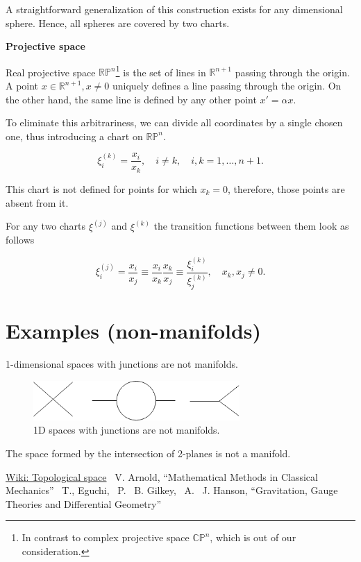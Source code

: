\documentclass[a4paper,10pt]{article}
\begin{document}
A straightforward generalization of this construction exists for any dimensional sphere. Hence, all spheres are covered by two charts.
\newline

{\bf Projective space}
\newline

Real projective space $\mathbb{RP}^n$\footnote{ In contrast to complex projective space $\mathbb{CP}^n$, which is out of our consideration.  } is the set of lines in $\mathbb{R}^{n+1}$ passing through the origin. A point $x \in \mathbb{R}^{n+1}, x\neq 0$ uniquely defines a line passing through the origin. On the other hand, the same line is defined by any other point $x' = \alpha x$. 

To eliminate this arbitrariness, we can divide all coordinates by a single chosen one, thus introducing a chart on $\mathbb{RP}^n$.

\begin{equation}
\xi^{(k)}_i = \frac{x_i}{x_k},  \quad i\neq k, \quad i,k = 1, \ldots, n+1.
\end{equation}

This chart is not defined for points for which $x_k = 0$, therefore, those points are absent from it. 

For any two charts $\xi^{(j)}$ and $\xi^{(k)}$ the transition functions between them look as follows

\begin{equation}
 \xi^{(j)}_i = \frac{x_i}{x_j} \equiv \frac{x_i}{x_k}\frac{x_k}{x_j} \equiv \frac{\xi^{(k)}_i}{\xi^{(k)}_j}, \quad x_k, x_j\neq 0.
\end{equation}


\newpage
\section{Examples (non-manifolds)}

1-dimensional spaces with junctions are not manifolds.

\begin{figure}[h]
\centering
 \includegraphics[width=0.7\textwidth]{../../images/NonManifolds.png}
 \caption{ 1D spaces with junctions are not manifolds.}
 \label{fig:nm}
\end{figure}

The space formed by the intersection of 2-planes is not a manifold.

\begin{thebibliography}{1}
 \href{https://en.wikipedia.org/wiki/Topological_space}{Wiki: Topological space}
 ~V. Arnold, ``Mathematical Methods in Classical Mechanics''
 ~T., Eguchi, ~P. ~B. Gilkey, ~A. ~J. Hanson,  ``Gravitation, Gauge Theories and Differential Geometry''
\end{thebibliography}
\end{document}

